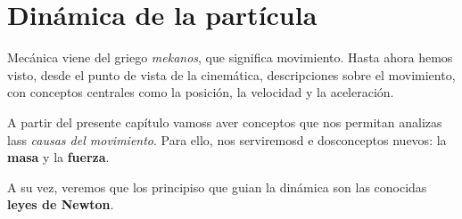 \section{Dinámica de la partícula}

Mecánica viene del griego \textit{mekanos},
que significa movimiento.
Hasta ahora hemos visto,
desde el punto de vista de  la cinemática,
descripciones sobre el movimiento,
con conceptos centrales como la posición, la velocidad y la aceleración.

A partir del presente capítulo  vamoss aver conceptos que nos permitan 
analizas lass \textit{causas del  movimiento}.
Para  ello, nos serviremosd e dosconceptos nuevos: 
la \textbf{masa} y la \textbf{fuerza}.

A su vez,
veremos que los principiso que guian la dinámica 
son las conocidas \textbf{leyes de Newton}.
